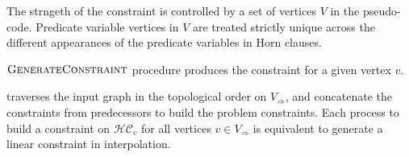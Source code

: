 \documentclass[a4paper,12pt]{article}
\begin{document}
The strngeth of the constraint is controlled by a set of vertices $V$
in the pseudo-code.  Predicate variable vertices in $V$ are treated
strictly unique across the different appearances of the predicate
variables in Horn clauses.



$\mbox{\sc GenerateConstraint}$ procedure produces the constraint for a given vertex $v$.


\begin{algorithm}
\caption{$ \genConstr (G, v, visited) $}\label{alg:genConstr}
\begin{algorithmic}
    \ELSE
    \ENDIF
  \ENDFOR
\ENDFOR
\end{algorithmic}
\end{algorithm}


traverses the input graph in the topological order on
$V_\Rightarrow$, and concatenate the constraints from predecessors to
build the problem constraints.  Each process to build a constraint on
$\mathcal{HC}_v$ for all vertices $v \in V_\Rightarrow$ is equivalent
to generate a linear constraint in interpolation.




\end{document}
